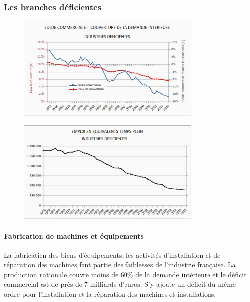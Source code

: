 \documentclass[a4paper]{article}
\begin{document}
\subsubsection{Les branches déficientes}

\begin{figure}[H]
    \centering
    \includegraphics*[width=0.8\textwidth]{images/solde4}
    \label{fig:solde4}
\end{figure}

\begin{figure}[H]
    \centering
    \includegraphics*[width=0.8\textwidth]{images/etp4}
    \label{fig:etp4}
\end{figure}

\paragraph{Fabrication de machines et équipements}
La fabrication des biens d’équipements, les activités d’installation et de réparation des machines font partie des faiblesses de l’industrie française. La production nationale couvre moins de 60\% de la demande intérieure et le déficit commercial est de près de 7 milliards d'euros. S’y ajoute un déficit du même ordre pour l’installation et la réparation des machines et installations. 
\end{document}
